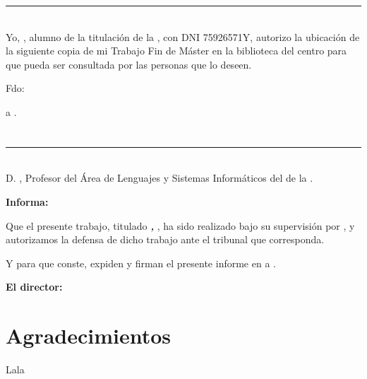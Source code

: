 \noindent\rule[-1ex]{\textwidth}{2pt}\\[4.5ex]

Yo, \textbf{\myName}, alumno de la titulación \myDegree de la \textbf{\myFaculty}, con DNI 75926571Y, autorizo la ubicación de la siguiente copia de mi Trabajo Fin de Máster en la biblioteca del centro para que pueda ser consultada por las personas que lo deseen.

\vspace{6cm}

\noindent Fdo: \myName

\vspace{2cm}

\begin{flushright}
\myLocation a \myTime.
\end{flushright}


\chapter*{}
\thispagestyle{empty}

\noindent\rule[-1ex]{\textwidth}{2pt}\\[4.5ex]

D. \textbf{\myProf}, Profesor del Área de Lenguajes y Sistemas Informáticos del \myDepartment de la \myUni.

\vspace{0.5cm}

\textbf{Informa:}

\vspace{0.5cm}

Que el presente trabajo, titulado \textit{\textbf{\myTitle, \mySubtitle}}, ha sido realizado bajo su supervisión por \textbf{\myName}, y autorizamos la defensa de dicho trabajo ante el tribunal que corresponda.

\vspace{0.5cm}

Y para que conste, expiden y firman el presente informe en \myLocation a \myTime.

\vspace{1cm}

\textbf{El director:}

\vspace{5cm}

\noindent \textbf{\myProf}

\chapter*{Agradecimientos}
\thispagestyle{empty}

\vspace{1cm}

Lala